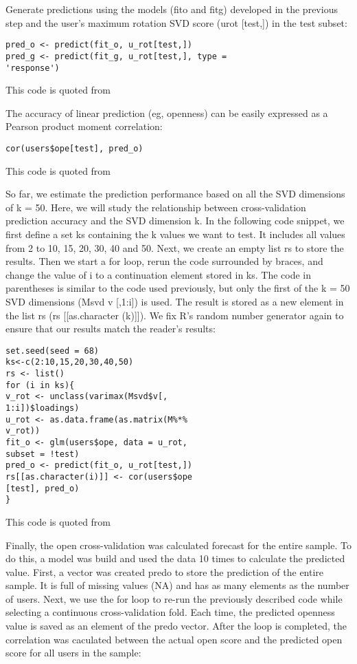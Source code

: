 Generate predictions using the models (fito and fitg) developed in
 the previous step and the user's maximum rotation SVD score 
(urot [test,]) in the test subset:

\begin{verbatim}
pred_o <- predict(fit_o, u_rot[test,])
pred_g <- predict(fit_g, u_rot[test,], type =
'response')
\end{verbatim}

This code is quoted from~\cite{editor12}

The accuracy of linear prediction (eg, openness) can be easily 
expressed as a Pearson product moment correlation:

\begin{verbatim}
cor(users$ope[test], pred_o)
\end{verbatim}

This code is quoted from~\cite{editor12}

So far, we estimate the prediction performance based on all the SVD
 dimensions of k = 50. Here, we will study the relationship between
 cross-validation prediction accuracy and the SVD dimension k. In 
the following code snippet, we first define a set ks containing the
 k values we want to test. It includes all values from 2 to 10, 15,
 20, 30, 40 and 50. Next, we create an empty list rs to store the 
results. Then we start a for loop, rerun the code surrounded by 
braces, and change the value of i to a continuation element stored
 in ks. The code in parentheses is similar to the code used 
previously, but only the first of the k = 50 SVD dimensions (Msvd 
 v [,1:i]) is used. The result is stored as a new element in the 
list rs (rs [[as.character (k)]]). We fix R's random number generator
 again to ensure that our results match the reader's results:

\begin{verbatim}
set.seed(seed = 68)
ks<-c(2:10,15,20,30,40,50)
rs <- list()
for (i in ks){
v_rot <- unclass(varimax(Msvd$v[,
1:i])$loadings)
u_rot <- as.data.frame(as.matrix(M%*%
v_rot))
fit_o <- glm(users$ope, data = u_rot,
subset = !test)
pred_o <- predict(fit_o, u_rot[test,])
rs[[as.character(i)]] <- cor(users$ope
[test], pred_o)
}
\end{verbatim}

This code is quoted from~\cite{editor12}

Finally, the open cross-validation was calculated forecast for the 
entire sample. To do this,  a model was build and used the data 10 
times to calculate the predicted value. First, a vector was created
predo to store the prediction of the entire sample. It is full of 
missing values (NA) and has as many elements as the number of 
users. Next, we use the for loop to re-run the previously described
 code while selecting a continuous cross-validation fold. Each 
time, the predicted openness value is saved as an element of the 
predo vector. After the loop is completed, the correlation was 
caculated between the actual open score and the predicted open 
score for all users in the sample:


